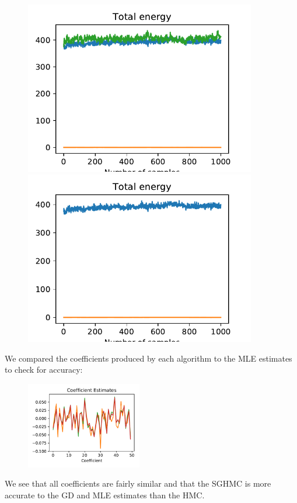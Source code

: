 \begin{figure}[H]
	\centering
	\begin{minipage}{0.45\textwidth}
		\centering
		\includegraphics[width=0.9\textwidth]{sghmc-energy-sim.pdf} %
	\end{minipage}\hfill
	\begin{minipage}{0.45\textwidth}
		\centering
		\includegraphics[width=0.9\textwidth]{sghmc-trace-sim.pdf} %
	\end{minipage}
\end{figure}

We compared the coefficients produced by each algorithm to the MLE estimates to check for accuracy:

\begin{figure}[H]
	\centering
	\includegraphics[width=0.45\textwidth]{coefs-sim.pdf}
\end{figure}

We see that all coefficients are fairly similar and that the SGHMC is more accurate to the GD and MLE estimates than the HMC.